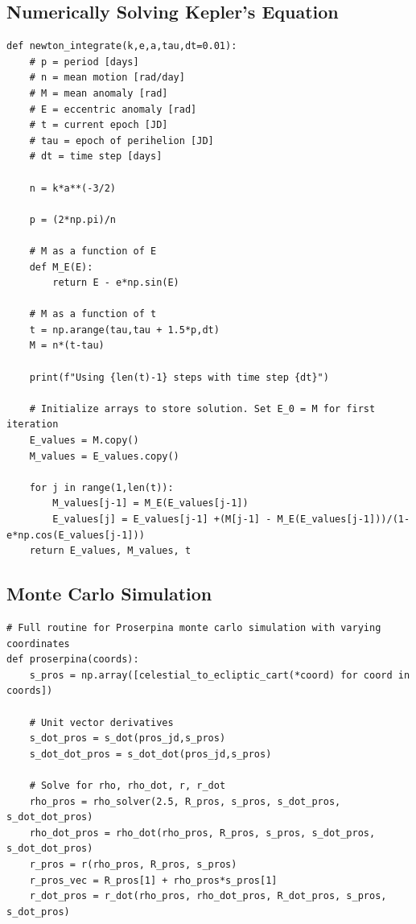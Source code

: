 \documentclass{article}
\begin{document}
\begin{appendices}
\subsection{Numerically Solving Kepler's Equation}
\begin{tiny}
\begin{verbatim}
def newton_integrate(k,e,a,tau,dt=0.01):
    # p = period [days]
    # n = mean motion [rad/day]
    # M = mean anomaly [rad]
    # E = eccentric anomaly [rad]
    # t = current epoch [JD]
    # tau = epoch of perihelion [JD]
    # dt = time step [days]

    n = k*a**(-3/2)

    p = (2*np.pi)/n

    # M as a function of E
    def M_E(E):
        return E - e*np.sin(E)
    
    # M as a function of t
    t = np.arange(tau,tau + 1.5*p,dt)
    M = n*(t-tau)

    print(f"Using {len(t)-1} steps with time step {dt}")
    
    # Initialize arrays to store solution. Set E_0 = M for first iteration
    E_values = M.copy()
    M_values = E_values.copy()

    for j in range(1,len(t)):
        M_values[j-1] = M_E(E_values[j-1])
        E_values[j] = E_values[j-1] +(M[j-1] - M_E(E_values[j-1]))/(1-e*np.cos(E_values[j-1]))
    return E_values, M_values, t
\end{verbatim}
\end{tiny}

\subsection{Monte Carlo Simulation}
\begin{tiny}
\begin{verbatim}
# Full routine for Proserpina monte carlo simulation with varying coordinates
def proserpina(coords):
    s_pros = np.array([celestial_to_ecliptic_cart(*coord) for coord in coords])

    # Unit vector derivatives
    s_dot_pros = s_dot(pros_jd,s_pros)
    s_dot_dot_pros = s_dot_dot(pros_jd,s_pros)

    # Solve for rho, rho_dot, r, r_dot
    rho_pros = rho_solver(2.5, R_pros, s_pros, s_dot_pros, s_dot_dot_pros)
    rho_dot_pros = rho_dot(rho_pros, R_pros, s_pros, s_dot_pros, s_dot_dot_pros)
    r_pros = r(rho_pros, R_pros, s_pros)
    r_pros_vec = R_pros[1] + rho_pros*s_pros[1]
    r_dot_pros = r_dot(rho_pros, rho_dot_pros, R_dot_pros, s_pros, s_dot_pros)


\end{verbatim}
\end{tiny}
\end{appendices}
\end{document}
